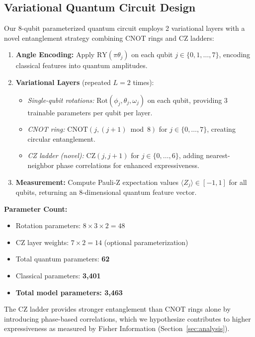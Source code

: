 \documentclass[conference]{IEEEtran}
\begin{document}
\subsection{Variational Quantum Circuit Design}

Our 8-qubit parameterized quantum circuit employs 2 variational layers with a novel entanglement strategy combining CNOT rings and CZ ladders:

\begin{enumerate}
\item \textbf{Angle Encoding:} Apply $\text{RY}(\pi\theta_j)$ on each qubit $j \in \{0, 1, \ldots, 7\}$, encoding classical features into quantum amplitudes.

\item \textbf{Variational Layers} (repeated $L=2$ times):
\begin{itemize}
\item \textit{Single-qubit rotations:} $\text{Rot}(\phi_j, \theta_j, \omega_j)$ on each qubit, providing 3 trainable parameters per qubit per layer.
\item \textit{CNOT ring:} $\text{CNOT}(j, (j{+}1) \bmod 8)$ for $j \in \{0, \ldots, 7\}$, creating circular entanglement.
\item \textit{CZ ladder (novel):} $\text{CZ}(j, j{+}1)$ for $j \in \{0, \ldots, 6\}$, adding nearest-neighbor phase correlations for enhanced expressiveness.
\end{itemize}

\item \textbf{Measurement:} Compute Pauli-Z expectation values $\langle Z_j \rangle \in [-1, 1]$ for all qubits, returning an 8-dimensional quantum feature vector.
\end{enumerate}

\noindent\textbf{Parameter Count:}
\begin{itemize}
\item Rotation parameters: $8 \times 3 \times 2 = 48$
\item CZ layer weights: $7 \times 2 = 14$ (optional parameterization)
\item Total quantum parameters: \textbf{62}
\item Classical parameters: \textbf{3,401}
\item \textbf{Total model parameters: 3,463}
\end{itemize}

The CZ ladder provides stronger entanglement than CNOT rings alone by introducing phase-based correlations, which we hypothesize contributes to higher expressiveness as measured by Fisher Information (Section~\ref{sec:analysis}).
\end{document}
